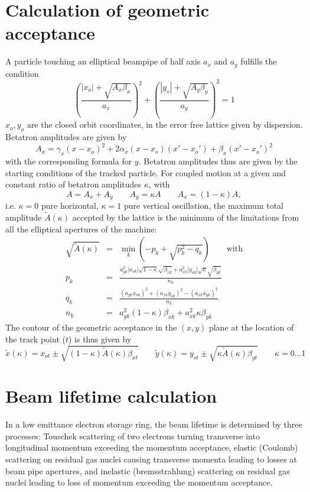 \documentclass[12pt]{article}
\begin{document}
\section{\label{appgeoa}Calculation of geometric acceptance}
A particle touching an elliptical beampipe of half axis $a_x$ and $a_y$ fulfills the condition
\[
\left(\frac{|x_o|+\sqrt{A_x\beta_x}}{a_x}\right)^2+\left(\frac{|y_o|+\sqrt{A_y\beta_y}}{a_y}\right)^2=1
\]
$x_o, y_o$ are the closed orbit coordinates, in the error free lattice given by dispersion.
Betatron amplitudes are given by
\[
A_x=\gamma_x (x-x_o)^2 + 2\alpha_x (x-x_o)(x'-x_o')+\beta_x(x'-x_o')^2
\]
with the corresponding formula for $y$. Betatron amplitudes thus are given by the starting conditions of the tracked particle.
For coupled motion at a given and constant ratio of betatron amplitudes $\kappa$, with
\[
A=A_x+A_y\qquad A_y=\kappa A\qquad A_x=(1-\kappa )A,
\]
i.e. $\kappa=0$ pure horizontal, $\kappa=1$ pure vertical oscillation, the maximum total amplitude $\tilde{A}(\kappa)$ accepted by the lattice is the minimum of the limitations from all the elliptical apertures of the machine:
\begin{eqnarray*}
\sqrt{\tilde{A}(\kappa )} & = & \min_k \left( -p_k+\sqrt{p_k^2-q_k}\right)\qquad\mbox{with} \\
p_k & = & \frac{a_{yk}^2|x_{ok}|\sqrt{1-\kappa}\sqrt{\beta_{xk}} + a_{xk}^2|y_{ok}|\sqrt{\kappa}\sqrt{\beta_{yk}}}{n_k}\quad \\
q_k & = & \frac{(a_{yk} x_{ok})^2 +(a_{xk} y_{ok})^2-(a_{xk} a_{yk})^2}{n_k}\qquad \\
n_k & = & a_{yk}^2(1-\kappa)\beta_{xk}+a_{xk}^2\kappa\beta_{yk}
\end{eqnarray*}
The contour of the geometric acceptance in the $(x,y)$ plane at the location of the track point ($t$) is thus given by
\[
\tilde{x}(\kappa )=x_{ot}\pm\sqrt{ (1-\kappa ) \tilde{A}(\kappa)\beta_{xt} }\qquad
\tilde{y}(\kappa )=y_{ot}\pm\sqrt{\kappa\tilde{A}(\kappa)\beta_{yt}}\qquad \kappa=0\dots 1
\]

\section{Beam lifetime calculation}
In a low emittance electron storage ring, the beam lifetime is determined by three processes: Touschek scattering of two electrons turning transverse into longitudinal momentum exceeding the momentum acceptance, elastic (Coulomb) scattering on residual gas nuclei causing transverse momenta leading to losses at beam pipe apertures, and inelastic (bremsstrahlung) scattering on residual gas nuclei leading to loss of momentum exceeding the momentum acceptance.
\end{document}
